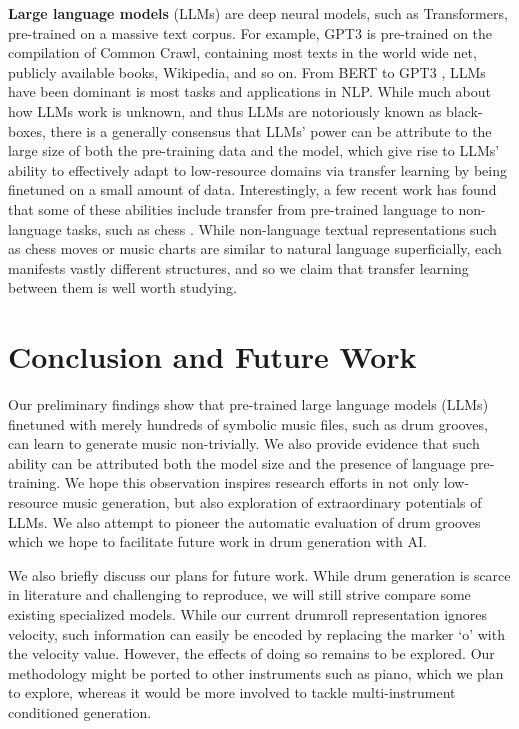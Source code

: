 \documentclass[letterpaper]{article} %
\begin{document}
\textbf{Large language models} (LLMs) are deep neural models, such as Transformers, pre-trained on a massive text corpus. For example, GPT3 is pre-trained on the compilation of Common Crawl, containing most texts in the world wide net, publicly available books, Wikipedia, and so on. From BERT \cite{devlin-etal-2019-bert} to GPT3 \cite{NEURIPS2020_1457c0d6}, LLMs have been dominant is most tasks and applications in NLP. While much about how LLMs work is unknown, and thus LLMs are notoriously known as black-boxes, there is a generally consensus that LLMs' power can be attribute to the large size of both the pre-training data and the model, which give rise to LLMs' ability to effectively adapt to low-resource domains via transfer learning by being finetuned on a small amount of data. Interestingly, a few recent work has found that some of these abilities include transfer from pre-trained language to non-language tasks, such as chess \cite{stockl-2021-watching}. While non-language textual representations such as chess moves or music charts are similar to natural language superficially, each manifests vastly different structures, and so we claim that transfer learning between them is well worth studying.

\vspace{-1.51mm}
\section{Conclusion and Future Work}
Our preliminary findings show that pre-trained large language models (LLMs) finetuned with merely hundreds of symbolic music files, such as drum grooves, can learn to generate music non-trivially. We also provide evidence that such ability can be attributed both the model size and the presence of language pre-training. We hope this observation inspires research efforts in not only low-resource music generation, but also exploration of extraordinary potentials of LLMs. We also attempt to pioneer the automatic evaluation of drum grooves which we hope to facilitate future work in drum generation with AI.

We also briefly discuss our plans for future work. While drum generation is scarce in literature and challenging to reproduce, we will still strive compare some existing specialized models. While our current drumroll representation ignores velocity, such information can easily be encoded by replacing the marker `o' with the velocity value. However, the effects of doing so remains to be explored. Our methodology might be ported to other instruments such as piano, which we plan to explore, whereas it would be more involved to tackle multi-instrument conditioned generation.
\end{document}
